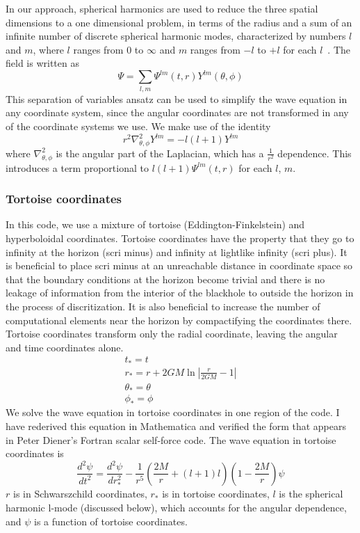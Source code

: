 In our approach, spherical harmonics are used to reduce the three spatial dimensions to a one dimensional problem, in terms of the radius and a sum of an infinite number of discrete spherical harmonic modes, characterized by numbers $l$ and $m$, where $l$ ranges from $0$ to $\infty$ and  $m$ ranges from $-l$ to $+l$ for each $l$~\cite{poisson_pound_vega_living_review}. The field is written as
\begin{equation}
  \Psi=\sum_{l,m}\Psi^{lm}(t,r)Y^{lm}(\theta,\phi)
\end{equation}
This separation of variables ansatz can be used to simplify the wave equation in any coordinate system, since the angular coordinates are not transformed in any of the coordinate systems we use. We make use of the identity
\begin{equation}
  r^2\nabla_{\theta,\phi}^2Y^{lm}=-l(l+1)Y^{lm}
\end{equation}
where $\nabla_{\theta,\phi}^2$ is the angular part of the Laplacian, which has a $\frac{1}{r^2}$ dependence. This introduces a term proportional to $l(l+1)\Psi^{lm}(t,r)$ for each $l$, $m$. 

\subsubsection{Tortoise coordinates}
In this code, we use a mixture of tortoise (Eddington-Finkelstein) and hyperboloidal coordinates. Tortoise coordinates have the property that they go to infinity at the horizon (scri minus) and infinity at lightlike infinity (scri plus). It is beneficial to place scri minus at an unreachable distance in coordinate space so that the boundary conditions at the horizon become trivial and there is no leakage of information from the interior of the blackhole to outside the horizon in the process of discritization. It is also beneficial to increase the number of computational elements near the horizon by compactifying the coordinates there. Tortoise coordinates transform only the radial coordinate, leaving the angular and time coordinates alone.~\cite{Wald}
\begin{eqnarray}
  t_*=t\\
  r_*=r+2GM\ln|\frac{r}{2GM}-1|\\
  \theta_*=\theta\\
  \phi_*=\phi
\end{eqnarray}
We solve the wave equation in tortoise coordinates in one region of the code. I have rederived this equation in Mathematica and verified the form that appears in Peter Diener's Fortran scalar self-force code. The wave equation in tortoise coordinates is
\begin{equation}
  \frac{d^2\psi}{dt^2}=\frac{d^2\psi}{dr_*^2}-\frac{1}{r^5}(\frac{2M}{r}+(l+1)l)(1-\frac{2M}{r})\psi
\end{equation}
$r$ is in Schwarszchild coordinates, $r_*$ is in tortoise coordinates, $l$ is the spherical harmonic l-mode (discussed below), which accounts for the angular dependence, and $\psi$ is a function of tortoise coordinates.


